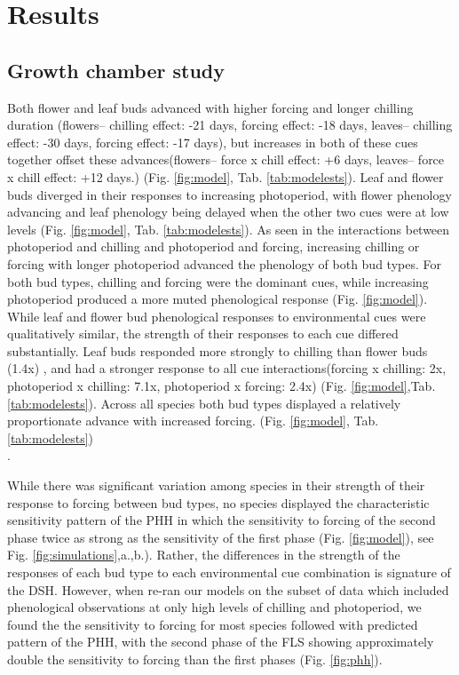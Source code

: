 \documentclass[11pt]{article}
\begin{document}
\section*{Results} %
\subsection*{Growth chamber study} %
\noindent  Both flower and leaf buds advanced with higher forcing and longer chilling duration (flowers-- chilling effect: -21 days, forcing effect: -18 days, leaves-- chilling effect: -30 days, forcing effect: -17 days), but increases in both of these cues together offset these advances(flowers-- force x chill effect: +6 days, leaves-- force x chill effect: +12 days.) (Fig. \ref{fig:model}, Tab. \ref{tab:modelests}). Leaf and flower buds diverged in their responses to increasing photoperiod, with flower phenology advancing and leaf phenology being delayed when the other two cues were at low levels (Fig. \ref{fig:model}, Tab. \ref{tab:modelests}). As seen in the interactions between photoperiod and chilling and photoperiod and forcing, increasing chilling or forcing with longer photoperiod advanced the phenology of both bud types. For both bud types, chilling and forcing were the dominant cues, while increasing photoperiod produced a more muted phenological response (Fig. \ref{fig:model}). \\

\noindent While leaf and flower bud phenological responses to environmental cues were qualitatively similar, the strength of their responses to each cue differed substantially. Leaf buds responded more strongly to chilling than flower buds (1.4x) , and had a stronger response to all cue interactions(forcing x chilling: 2x, photoperiod x chilling: 7.1x, photoperiod x forcing: 2.4x) (Fig. \ref{fig:model},Tab. \ref{tab:modelests}). Across all species both bud types displayed a relatively proportionate advance with increased forcing. (Fig. \ref{fig:model}, Tab. \ref{tab:modelests})\\. 

\noindent While there was significant variation among species in their strength of their response to forcing between bud types, no species displayed the characteristic sensitivity pattern of the PHH in which the sensitivity to forcing of the second phase twice as strong as the sensitivity of the first phase (Fig. \ref{fig:model}), see Fig. \ref{fig:simulations},a.,b.). Rather, the differences in the strength of the responses of each bud type to each environmental cue combination is signature of the DSH. However, when re-ran our models on the subset of data which included phenological observations at only high levels of chilling and photoperiod, we found the the sensitivity to forcing for most species followed with predicted pattern of the PHH, with the second phase of the FLS showing approximately double the sensitivity to forcing than the first phases (Fig. \ref{fig:phh}).\\ %
\end{document}
